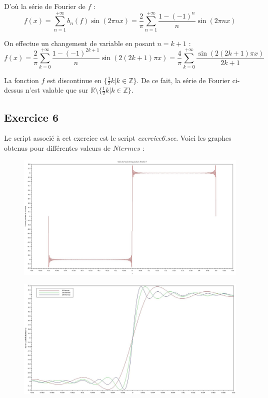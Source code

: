 \documentclass[a4paper,11pt]{article}
\begin{document}
	D'où la série de Fourier de $f$ :
	\begin{equation*}
		f(x) = \sum_{n=1}^{+ \infty} b_{n}(f) \sin (2 \pi n x) = \frac{2}{\pi} \sum_{n=1}^{+ \infty} \frac{1-(-1)^{n}}{n} \sin (2 \pi n x)
	\end{equation*}

	On effectue un changement de variable en posant $n=k+1$ :
	\begin{equation*}
		f(x) =  \frac{2}{\pi} \sum_{k=0}^{+ \infty} \frac{1-(-1)^{2k+1}}{n} \sin (2 (2k+1) \pi x)
		= \frac{4}{\pi} \sum_{k=0}^{+ \infty} \frac{\sin (2 (2k+1) \pi x)}{2k+1}
	\end{equation*}
	
	La fonction $f$ est discontinue en $\{\frac{1}{2} k | k \in \mathbb{Z}\}$. De ce fait, la série de Fourier ci-dessus n'est valable que sur $\mathbb{R} \setminus \{\frac{1}{2} k | k \in \mathbb{Z}\}$.

\subsection*{Exercice 6}
	Le script associé à cet exercice est le script \textit{exercice6.sce}. Voici les graphes obtenus pour différentes valeurs de $Ntermes$ :
	
\begin{figure}[H]
	\centering
	\includegraphics[width=400pt]{graphes/exercice6-1.jpg}	
\end{figure}
\begin{figure}[H]
	\centering
	\includegraphics[width=400pt]{graphes/exercice6-2.jpg}	
\end{figure}
\end{document}
